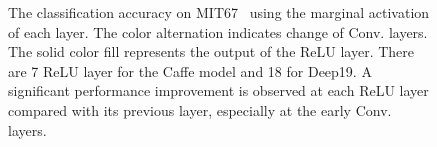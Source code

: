\documentclass[10pt,twocolumn,letterpaper]{article}
\begin{document}
\begin{figure}[htbp]
\centering
\caption{The classification accuracy on MIT67~\cite{MIT67} using the marginal activation of each layer. The color alternation indicates change of Conv. layers. The solid color fill represents the output of the ReLU layer. There are 7 ReLU layer for the Caffe model and 18 for Deep19. A significant performance improvement is observed at each ReLU layer compared with its previous layer, especially at the early Conv. layers.}

\label{fig:layer_MIT67}
\end{figure}


%
\end{document}
